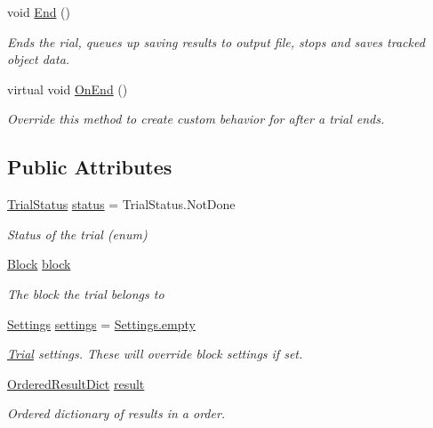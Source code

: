 \begin{DoxyCompactItemize}
void \hyperlink{class_exp_mngr_1_1_trial_a34bdc21e8c6b5a686d893ca5ecd1b916}{End} ()
\begin{DoxyCompactList}\small\item\em Ends the rial, queues up saving results to output file, stops and saves tracked object data. \end{DoxyCompactList}\item 
virtual void \hyperlink{class_exp_mngr_1_1_trial_a0c010c02f70930a36b52c6d828040b5a}{On\+End} ()
\begin{DoxyCompactList}\small\item\em Override this method to create custom behavior for after a trial ends. \end{DoxyCompactList}\end{DoxyCompactItemize}
\subsection*{Public Attributes}
\begin{DoxyCompactItemize}
\item 
\hyperlink{namespace_exp_mngr_a8a72f39778ead3dc04af13a60949175c}{Trial\+Status} \hyperlink{class_exp_mngr_1_1_trial_a1725d79305b17692b7be6075c00fa026}{status} = Trial\+Status.\+Not\+Done
\begin{DoxyCompactList}\small\item\em Status of the trial (enum) \end{DoxyCompactList}\item 
\hyperlink{class_exp_mngr_1_1_block}{Block} \hyperlink{class_exp_mngr_1_1_trial_ab1e65f76d97081ae962fe22637a32bad}{block}
\begin{DoxyCompactList}\small\item\em The block the trial belongs to \end{DoxyCompactList}\item 
\hyperlink{class_exp_mngr_1_1_settings}{Settings} \hyperlink{class_exp_mngr_1_1_trial_a6f92b03ff55c788613c0bd44e1190449}{settings} = \hyperlink{class_exp_mngr_1_1_settings_a9a79c93bbbd6158a6ae543a615da6e6a}{Settings.\+empty}
\begin{DoxyCompactList}\small\item\em \hyperlink{class_exp_mngr_1_1_trial}{Trial} settings. These will override block settings if set. \end{DoxyCompactList}\item 
\hyperlink{class_ordered_result_dict}{Ordered\+Result\+Dict} \hyperlink{class_exp_mngr_1_1_trial_aecde0037b2ddec7c09c6b4f2a6c12263}{result}
\begin{DoxyCompactList}\small\item\em Ordered dictionary of results in a order. \end{DoxyCompactList}\end{DoxyCompactItemize}
